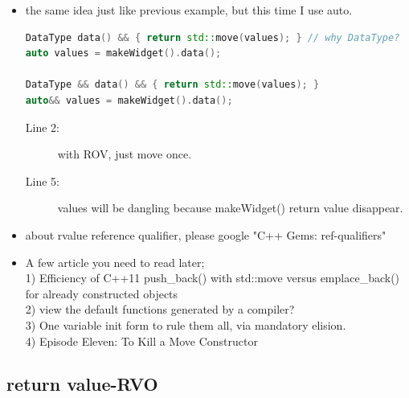 \documentclass[a4paper,11pt,twoside]{book}
\begin{document}
\begin{itemize}
\item the same idea just like previous example, but this time I use auto.
\begin{lstlisting}[frame=single, language=c++]
DataType data() && { return std::move(values); } // why DataType?
auto values = makeWidget().data();

DataType && data() && { return std::move(values); }
auto&& values = makeWidget().data();
\end{lstlisting}
\begin{description}
	\item[Line 2:] with ROV, just move once. 
	\item[Line 5:] values will be dangling because makeWidget() return value disappear.
\end{description}

	\item about rvalue reference qualifier, please google "C++ Gems: ref-qualifiers"
	
	\item A few article you need to read later; \\
	1) Efficiency of C++11 push\_back() with std::move versus emplace\_back() for already constructed objects \\
	
	2) view the default functions generated by a compiler?\\
	
	3) One variable init form to rule them all, via mandatory elision.\\
	
	4) Episode Eleven: To Kill a Move Constructor\\
\end{itemize}

\subsection{return value-RVO}
\end{document}
